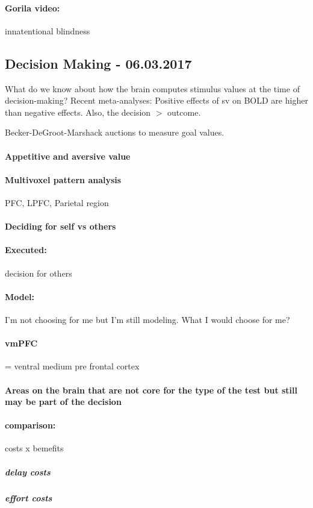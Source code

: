 \documentclass[12pt,article,oneside,a4paper]{memoir}
\begin{document}
\paragraph{Gorila video:} innatentional blindness

\subsection{Decision Making - 06.03.2017}
What do we know about how the brain computes stimulus values at the time of decision-making? Recent meta-analyses: Positive effects of sv on BOLD are higher than negative effects. Also, the decision $>$ outcome.

Becker-DeGroot-Marshack auctions to measure goal values.

\paragraph{Appetitive and aversive value}
\paragraph{Multivoxel pattern analysis} PFC, LPFC, Parietal region
\paragraph{Deciding for self vs others}
\paragraph{Executed:} decision for others
\paragraph{Model:} I'm not choosing for me but I'm still modeling. What I would choose for me?
\paragraph{vmPFC} = ventral medium pre frontal cortex
\paragraph{Areas on the brain that are not core for the type of the test but still may be part of the decision}
\paragraph{comparison:} costs x bemefits
\subparagraph{delay costs}
\subparagraph{effort costs}
\end{document}

